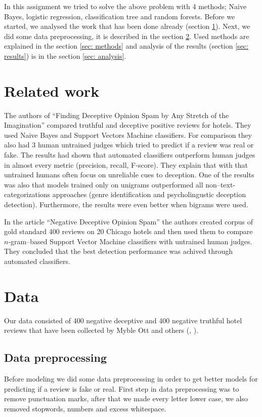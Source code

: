 \documentclass[a4paper,11pt]{article}
\begin{document}
In this assignment we tried to solve the above problem with 4 methods; Naive Bayes, logistic regression, classification tree and random forests. Before we started, we analysed the work that has been done already (section \ref{sec: relatedwork}). Next, we did some data preprocessing, it is described in the section \ref{sec: data}. Used methods are explained in the section \ref{sec: methods} and analysis of the results (section \ref{sec: results}) is in the section \ref{sec: analysis}.

\section{Related work}
\label{sec: relatedwork}
The authors of “Finding Deceptive Opinion Spam by Any Stretch of the Imagination” \cite{article1} compared truthful and deceptive positive reviews for hotels. They used Naive Bayes and Support Vectors Machine classifiers. For comparison they also had 3 human untrained judges which tried to predict if a review was real or fake.  The results had shown that automated classifiers outperform human judges in almost every metric (precision, recall, F-score). They explain that with that untrained humans often focus on unreliable cues to
deception. One of the results was also that models trained only on unigrams outperformed all non--text-categorizations approaches (genre identification and psycholingustic deception detection). Furthermore, the results were even better when bigrams were used.

In the article “Negative Deceptive Opinion Spam” \cite{article2} the authors created corpus of gold standard 400 reviews on 20 Chicago hotels and then used them to compare $n$-gram--based Support Vector Machine classifiers with untrained human judges. They concluded that the best detection performance was achived through automated classifiers. 

\section{Data}
\label{sec: data}
Our data consisted of 400 negative deceptive and 400 negative truthful hotel reviews that have been collected by Myble Ott and others (\cite{article2}, \cite{article1}). 

\subsection{Data preprocessing}
Before modeling we did some data preprocessing in order to get better models for predicting if a review is fake or real. First step in data preprocessing was to remove punctuation marks, after that we made every letter lower case, we also removed stopwords, numbers and excess whitespace. 
\end{document}
